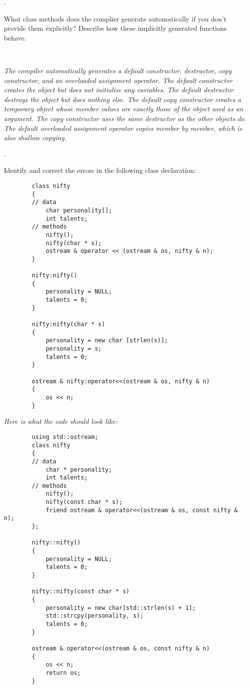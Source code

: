 \documentclass{amsart}
\begin{document}
. 
\begin{minipage}[t]{11.5 cm}
	What class methods does the complier generate automatically if you don't provide them explicitly? Describe how these implicitly generated functions behave.
\end{minipage} \\[1ex]
\phantom{3. } 
\begin{minipage}[t]{11.5 cm}
	{\slshape 
		The compiler automatically generates a default constructor,
		destructor, copy constructor, and an overloaded assignment
		operator.
		The default constructor creates the object but does not initialize
		any variables.
		The default destructor destroys the object but does nothing else.
		The default copy constructor creates a temporary object
		whose member values are exactly those of the object used as
		an argument.
		The copy constructor uses the same destructor as the other
		objects do.
		The default overloaded assignment operator copies member by
		member, which is also shallow copying. 
	} 
\end{minipage} 
\vfill 
\newpage

\phantom{\quad}
\vfill
{}. 
\begin{minipage}[t]{11.5 cm}
	Identify and correct the errors in the following class declaration:
	\begin{verbatim}
		class nifty
		{
		// data
		    char personality[];
		    int talents;
		// methods
		    nifty();
		    nifty(char * s);
		    ostream & operator << (ostream & os, nifty & n);
		}

		nifty:nifty()
		{
		    personality = NULL; 
		    talents = 0;
		}

		nifty:nifty(char * s)
		{
		    personality = new char [strlen(s)];
		    personality = s;
		    talents = 0;
		}

		ostream & nifty:operator<<(ostream & os, nifty & n)
		{
		    os << n;
		}
	\end{verbatim}
\end{minipage}
\vfill
\newpage

\phantom{\quad}
\vfill
\phantom{2. } 
\begin{minipage}[t]{11.5 cm}
	{\slshape 
		Here is what the code should look like:
	}
	\begin{verbatim}
		using std::ostream;
		class nifty
		{
		// data
		    char * personality;
		    int talents;
		// methods
		    nifty();
		    nifty(const char * s);
		    friend ostream & operator<<(ostream & os, const nifty & n);
		};

		nifty::nifty()
		{
		    personality = NULL; 
		    talents = 0;
		}

		nifty::nifty(const char * s)
		{
		    personality = new char[std::strlen(s) + 1];
		    std::strcpy(personality, s);
		    talents = 0;
		}

		ostream & operator<<(ostream & os, const nifty & n)
		{
		    os << n;
		    return os;
		}
	\end{verbatim}
\end{minipage} 
\vfill
\newpage
\end{document}
